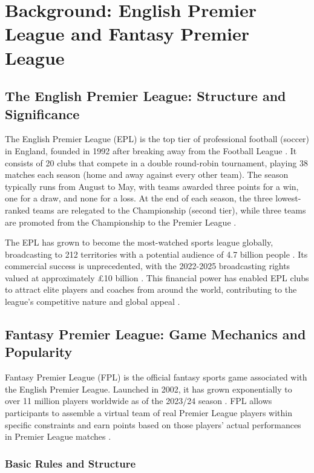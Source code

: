 \section{Background: English Premier League and Fantasy Premier League}

\subsection{The English Premier League: Structure and Significance}

The English Premier League (EPL) is the top tier of professional football (soccer) in England, founded in 1992 after breaking away from the Football League \cite{conn2017}. It consists of 20 clubs that compete in a double round-robin tournament, playing 38 matches each season (home and away against every other team). The season typically runs from August to May, with teams awarded three points for a win, one for a draw, and none for a loss. At the end of each season, the three lowest-ranked teams are relegated to the Championship (second tier), while three teams are promoted from the Championship to the Premier League \cite{premierleague2023}.

The EPL has grown to become the most-watched sports league globally, broadcasting to 212 territories with a potential audience of 4.7 billion people \cite{buraimo2015}. Its commercial success is unprecedented, with the 2022-2025 broadcasting rights valued at approximately £10 billion \cite{evens2022}. This financial power has enabled EPL clubs to attract elite players and coaches from around the world, contributing to the league's competitive nature and global appeal \cite{szymanski2005}.

\subsection{Fantasy Premier League: Game Mechanics and Popularity}

Fantasy Premier League (FPL) is the official fantasy sports game associated with the English Premier League. Launched in 2002, it has grown exponentially to over 11 million players worldwide as of the 2023/24 season \cite{fpl2023}. FPL allows participants to assemble a virtual team of real Premier League players within specific constraints and earn points based on those players' actual performances in Premier League matches \cite{bonomo2014}.

\subsubsection{Basic Rules and Structure}

